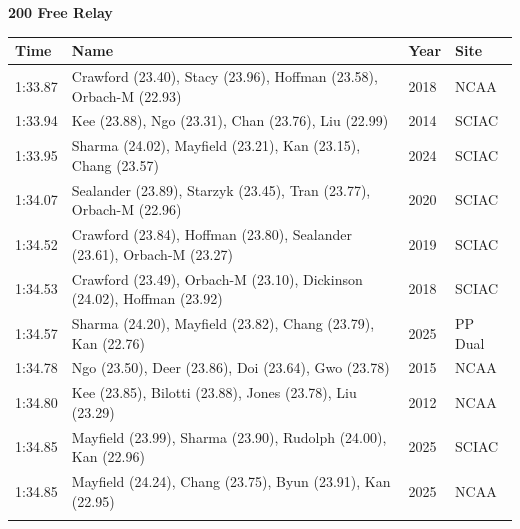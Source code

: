 \vspace{1.2em}
\noindent\begin{minipage}[t]{0.98\textwidth}
\centering
\textbf{\textcolor{teamprimary}{200 Free Relay}}\par
\vspace{0.5em}
\centering
\small
\renewcommand{\arraystretch}{1.0}
\setlength{\tabcolsep}{4pt}
\begin{tabular}{@{}p{2.7cm}p{4.3cm}p{1.6cm}p{2.7cm}@{}}
\toprule
\textbf{Time} & \textbf{Name} & \textbf{Year} & \textbf{Site} \\
\midrule
1:33.87 & Crawford (23.40), Stacy (23.96), Hoffman (23.58), Orbach-M (22.93) & 2018 & NCAA \\
1:33.94 & Kee (23.88), Ngo (23.31), Chan (23.76), Liu (22.99) & 2014 & SCIAC \\
1:33.95 & Sharma (24.02), Mayfield (23.21), Kan (23.15), Chang (23.57) & 2024 & SCIAC \\
1:34.07 & Sealander (23.89), Starzyk (23.45), Tran (23.77), Orbach-M (22.96) & 2020 & SCIAC \\
1:34.52 & Crawford (23.84), Hoffman (23.80), Sealander (23.61), Orbach-M (23.27) & 2019 & SCIAC \\
1:34.53 & Crawford (23.49), Orbach-M (23.10), Dickinson (24.02), Hoffman (23.92) & 2018 & SCIAC \\
1:34.57 & Sharma (24.20), Mayfield (23.82), Chang (23.79), Kan (22.76) & 2025 & PP Dual \\
1:34.78 & Ngo (23.50), Deer (23.86), Doi (23.64), Gwo (23.78) & 2015 & NCAA \\
1:34.80 & Kee (23.85), Bilotti (23.88), Jones (23.78), Liu (23.29) & 2012 & NCAA \\
1:34.85 & Mayfield (23.99), Sharma (23.90), Rudolph (24.00), Kan (22.96) & 2025 & SCIAC \\
1:34.85 & Mayfield (24.24), Chang (23.75), Byun (23.91), Kan (22.95) & 2025 & NCAA \\
\bottomrule
\vspace{0.5em}
\end{tabular}
\end{minipage}
\vspace{1.2em}
